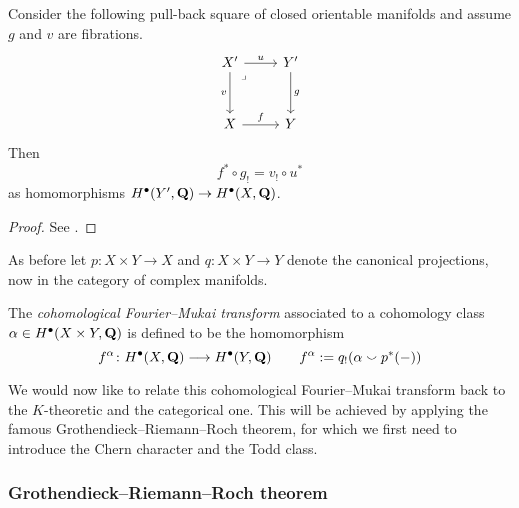 \begin{proposition}
    Consider the following pull-back square of closed orientable manifolds and assume $g$ and $v$ are fibrations.
    \[\begin{tikzcd}[row sep = 3em]
        {X'} & {Y'} \\
        X & Y
        \arrow["u", from=1-1, to=1-2]
        \arrow["v"', from=1-1, to=2-1]
        \arrow["\lrcorner"{anchor=center, pos=0.125}, draw=none, from=1-1, to=2-2]
        \arrow["g", from=1-2, to=2-2]
        \arrow["f", from=2-1, to=2-2]
    \end{tikzcd}\]
    Then
    \begin{equation}
        \label{eq: cohomological base change}
        f^* \circ g_! = v_! \circ u^* 
    \end{equation}
    as homomorphisms $H^{\bullet}(Y', \mathbf Q) \to H^{\bullet}(X, \mathbf Q)$.
\end{proposition}

\begin{proof}
    See \cite[\S 6.1, Theorem 6.2]{Fulton1998}.
\end{proof}

As before let $p \colon X \times Y \to X$ and $q \colon X \times Y \to Y$ denote the canonical projections, now in the category of complex manifolds. 

\begin{definition}
    The \emph{cohomological Fourier--Mukai transform} associated to a cohomology class $\alpha \in H^{\bullet}(X \times Y, \mathbf Q)$ is defined to be the homomorphism
    \[
        f^\alpha \colon H^{\bullet}(X, \mathbf Q) \longrightarrow H^{\bullet}(Y, \mathbf Q) \qquad f^{\alpha} := q_!(\alpha \smallsmile p^*(-))
    \]
\end{definition}

We would now like to relate this cohomological Fourier--Mukai transform back to the $K$-theoretic and the categorical one. This will be achieved by applying the famous Grothendieck--Riemann--Roch theorem, 
for which we first need to introduce the Chern character and the Todd class. 

\subsubsection*{Grothendieck--Riemann--Roch theorem}

